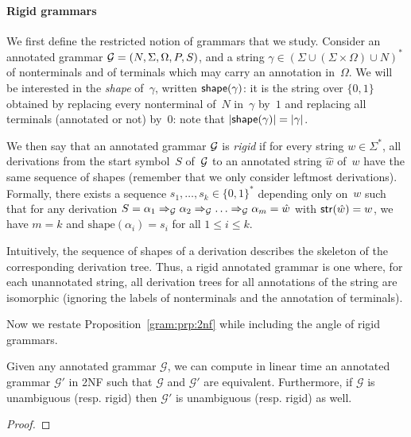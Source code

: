%
%

\paragraph{Rigid grammars}
We first define the restricted notion of grammars that we study.
%
Consider an annotated grammar $\mathcal{G} = (N, \Sigma, \Omega, P, S)$, and a string
$\gamma\in (\Sigma \cup (\Sigma \times \Omega)\cup N)^*$ of nonterminals and
of terminals which may carry an annotation in~$\Omega$. We will be interested in
the \emph{shape}
of~$\gamma$, written $\mathsf{shape}(\gamma)$: it is the string over $\{0, 1\}$
obtained by replacing every nonterminal of~$N$ in~$\gamma$ by~$1$ and replacing
all terminals (annotated or not) by~$0$: note that $|\mathsf{shape}(\gamma)| = |\gamma|$.

We then say that an annotated grammar $\mathcal{G}$ is \emph{rigid}
%
%
        if for every string
        $w \in \Sigma^*$, all derivations from the start symbol~$S$ of~$\mathcal{G}$ to
        an annotated string $\hat{w}$ of~$w$ have the same sequence of shapes
        (remember that we only consider leftmost derivations).
        Formally, there exists a sequence $s_1, \ldots, s_k \in \{0,
        1\}^*$ depending only on~$w$ such that for any derivation 
        $S = \alpha_1 \Rightarrow_{\mathcal{G}} \alpha_2 \Rightarrow_{\mathcal{G}} \ldots \Rightarrow_{\mathcal{G}} \alpha_m =
        \hat{w}$ with $\mathsf{str}(\hat{w}) = w$, we have $m = k$ and $\mathrm{shape}(\alpha_i) = s_i$ for all $1
        \leq i \leq k$.
%

Intuitively, the sequence of shapes of a derivation describes the
skeleton of the corresponding derivation tree. Thus, a rigid annotated
grammar is one where, for each unannotated string, all derivation trees for all
annotations of the string are isomorphic (ignoring the labels of 
nonterminals and the annotation of terminals).

Now we restate Proposition~\ref{gram:prp:2nf} while including the angle of rigid grammars.

\begin{proposition}
  \label{gram:prp:2nfrig}
  Given any annotated grammar\/ $\mathcal{G}$, we can compute in linear time an annotated
  grammar $\mathcal{G}'$ in 2NF such that $\mathcal{G}$ and $\mathcal{G}'$ are
  equivalent. Furthermore, if $\mathcal{G}$ is unambiguous (resp. rigid) then $\mathcal{G}'$ is unambiguous (resp. rigid) as well.
\end{proposition}
\begin{proof}
  
\end{proof}










